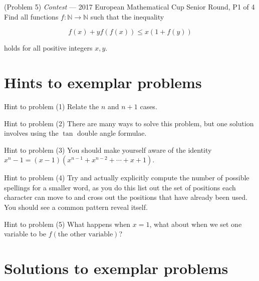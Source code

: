 \documentclass{article}
\begin{document}
\vspace{-0.5cm}
\begin{problem}{(Problem 5) \textit{Contest} --- 2017 European Mathematical Cup Senior Round, P1 of 4}
Find all functions $f : \mathbb{N} \rightarrow \mathbb{N}$ such that the inequality

$$
f(x) + yf(f(x)) \leq x(1 + f(y))
$$

holds for all positive integers $x, y$.
\end{problem}

\newpage

\section{Hints to exemplar problems}

\begin{hint}{Hint to problem (1)}
 Relate the $n$ and $n+1$ cases.
\end{hint}

\begin{hint}{Hint to problem (2)}
There are many ways to solve this problem, but one solution involves using the $\tan$ double angle formulae.
\end{hint}

\begin{hint}{Hint to problem (3)}
You should make yourself aware of the identity $x^n - 1 = (x-1)(x^{n-1} + x^{n-2} + \cdots + x + 1)$.
\end{hint}

\begin{hint}{Hint to problem (4)}
Try and actually explicitly compute the number of possible spellings for a smaller word, as you do this list out the set of positions each character can move to and
cross out the positions that have already been used. You should see a common pattern reveal itself.
\end{hint}

\begin{hint}{Hint to problem (5)}
What happens when $x=1$, what about when we set one variable to be $f(\text{the other variable})$?
\end{hint}
\newpage

\section{Solutions to exemplar problems}
\end{document}

